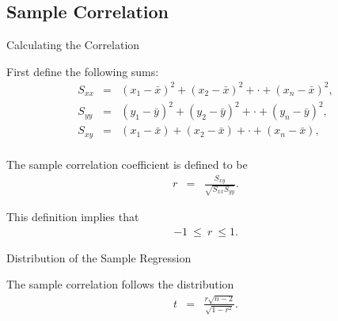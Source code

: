 \subsection{Sample Correlation}

\begin{frame}{Calculating the Correlation}

  First define the following sums:
  \begin{eqnarray*}
    S_{xx} & = & (x_1-\bar{x})^2 + (x_2-\bar{x})^2 + \cdot + (x_n-\bar{x})^2, \\
    S_{yy} & = & (y_1-\bar{y})^2 + (y_2-\bar{y})^2 + \cdot + (y_n-\bar{y})^2, \\
    S_{xy} & = & (x_1-\bar{x}) + (x_2-\bar{x}) + \cdot + (x_n-\bar{x}), \\
  \end{eqnarray*}


  \begin{definition}
    The sample correlation coefficient is defined to be
    \begin{eqnarray*}
      r & = & \frac{S_{xy}}{\sqrt{S_{xx} S_{yy}}}.
    \end{eqnarray*}
  \end{definition}

  This definition implies that
  \begin{eqnarray*}
    -1 ~ \leq ~ r ~ \leq 1.
  \end{eqnarray*}
  
\end{frame}


\begin{frame}{Distribution of the Sample Regression}

  \begin{definition}
    The sample correlation follows the distribution
    \begin{eqnarray*}
      t & = & \frac{r\sqrt{n-2}}{\sqrt{1-r^2}}.
    \end{eqnarray*}
  \end{definition}
  
\end{frame}




